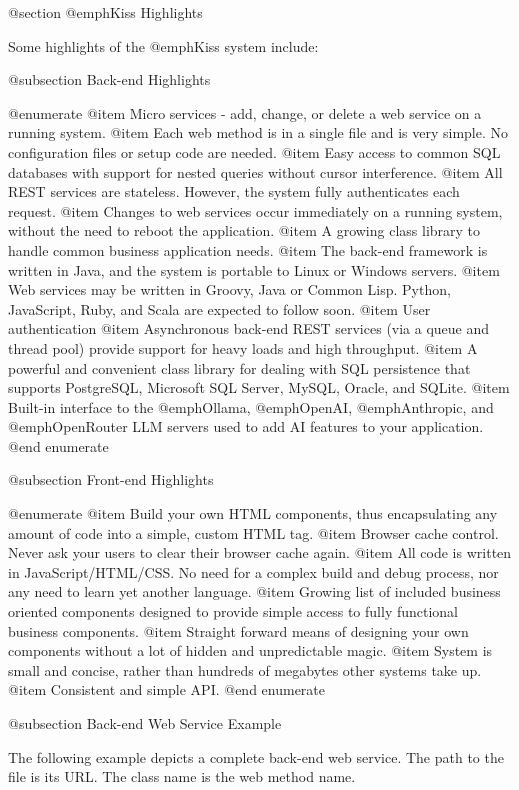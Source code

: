 @section @emph{Kiss} Highlights

Some highlights of the @emph{Kiss} system include:

@subsection Back-end Highlights

@enumerate
@item
Micro services - add, change, or delete a web service on a running system.
@item
Each web method is in a single file and is very simple.  No
configuration files or setup code are needed.
@item
Easy access to common SQL databases with support for nested queries
without cursor interference.
@item
All REST services are stateless.  However, the system fully
authenticates each request.
@item
Changes to web services occur immediately on a running system,
without the need to reboot the application.
@item
A growing class library to handle common business application needs.
@item
The back-end framework is written in Java, and the system is portable to
Linux or Windows servers.
@item
Web services may be written in Groovy, Java or Common Lisp.  Python,
JavaScript, Ruby, and Scala are expected to follow soon.
@item
User authentication
@item
Asynchronous back-end REST services (via a queue and thread pool)
provide support for heavy loads and high throughput.
@item
A powerful and convenient class library for dealing with SQL persistence that
supports PostgreSQL, Microsoft SQL Server, MySQL, Oracle, and SQLite.
@item
Built-in interface to the @emph{Ollama}, @emph{OpenAI}, @emph{Anthropic}, and @emph{OpenRouter} LLM servers used to add AI features to your application.
@end enumerate


@subsection Front-end Highlights

@enumerate
@item
Build your own HTML components, thus encapsulating any amount of code
into a simple, custom HTML tag.
@item
Browser cache control.  Never ask your users to clear their browser cache again.
@item
All code is written in JavaScript/HTML/CSS.  No need for a complex build
and debug process, nor any need to learn yet another language.
@item
Growing list of included business oriented components designed to
provide simple access to fully functional business components.
@item
Straight forward means of designing your own components without a lot
of hidden and unpredictable magic.
@item
System is small and concise, rather than hundreds of megabytes other
systems take up.
@item
Consistent and simple API.
@end enumerate

@subsection Back-end Web Service Example


The following example depicts a complete back-end web service.  The
path to the file is its URL.  The class name is the web method name.

